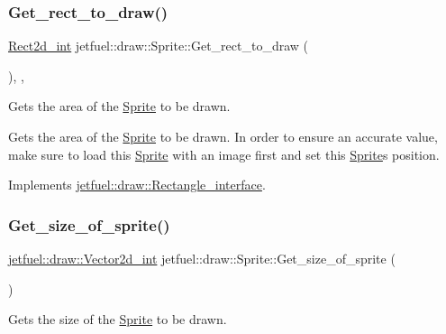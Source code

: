 \subsubsection{\texorpdfstring{Get\+\_\+rect\+\_\+to\+\_\+draw()}{Get\_rect\_to\_draw()}}
{\footnotesize\ttfamily \hyperlink{classjetfuel_1_1draw_1_1Rect2d}{Rect2d\+\_\+int} jetfuel\+::draw\+::\+Sprite\+::\+Get\+\_\+rect\+\_\+to\+\_\+draw (\begin{DoxyParamCaption}{ }\end{DoxyParamCaption})\hspace{0.3cm}{\ttfamily [inline]}, {\ttfamily [override]}, {\ttfamily [virtual]}}



Gets the area of the \hyperlink{classjetfuel_1_1draw_1_1Sprite}{Sprite} to be drawn. 

Gets the area of the \hyperlink{classjetfuel_1_1draw_1_1Sprite}{Sprite} to be drawn. In order to ensure an accurate value, make sure to load this \hyperlink{classjetfuel_1_1draw_1_1Sprite}{Sprite} with an image first and set this \hyperlink{classjetfuel_1_1draw_1_1Sprite}{Sprite}\textquotesingle{}s position. 

Implements \hyperlink{classjetfuel_1_1draw_1_1Rectangle__interface_a03fd3b6842ab7b3065379caec407296f}{jetfuel\+::draw\+::\+Rectangle\+\_\+interface}.

\mbox{\label{classjetfuel_1_1draw_1_1Sprite_ad79f542ad5da9713048a80595629272a}} 
\subsubsection{\texorpdfstring{Get\+\_\+size\+\_\+of\+\_\+sprite()}{Get\_size\_of\_sprite()}}
{\footnotesize\ttfamily \hyperlink{classjetfuel_1_1draw_1_1Vector2d}{jetfuel\+::draw\+::\+Vector2d\+\_\+int} jetfuel\+::draw\+::\+Sprite\+::\+Get\+\_\+size\+\_\+of\+\_\+sprite (\begin{DoxyParamCaption}{ }\end{DoxyParamCaption})\hspace{0.3cm}{\ttfamily [inline]}}



Gets the size of the \hyperlink{classjetfuel_1_1draw_1_1Sprite}{Sprite} to be drawn. 

